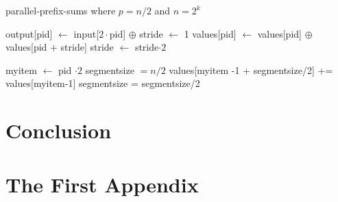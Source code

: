 \documentclass[12pt,twoside]{reedthesis}
\begin{document}
\begin{algorithm}[h!]
\caption{parallel-prefix-sums where $p = n/2$ and $n=2^k$}
\begin{algorithmic}
\STATE output[pid] $\leftarrow$ input[$2\cdot \mbox{pid}$] $\oplus$
\STATE stride $\leftarrow$ 1
\STATE values[pid] $\leftarrow$ values[pid] $\oplus$ values[pid $+$ stride] 
\STATE stride $\leftarrow$ stride$\cdot 2$
\ENDWHILE
\RETURN

\STATE myitem $\leftarrow$ pid $\cdot 2$ 
\STATE segmentsize $= n/2$
\STATE values[myitem -1 + segmentsize/2] += values[myitem-1]
\ENDIF
\STATE segmentsize = segmentsize/2

\ENDWHILE
\end{algorithmic}
\end{algorithm}
	
\chapter*{Conclusion}
	\setcounter{chapter}{4}
	\setcounter{section}{0}
	

    \appendix
      \chapter{The First Appendix}



  \backmatter 

    \nocite{*}
    
\end{document}
